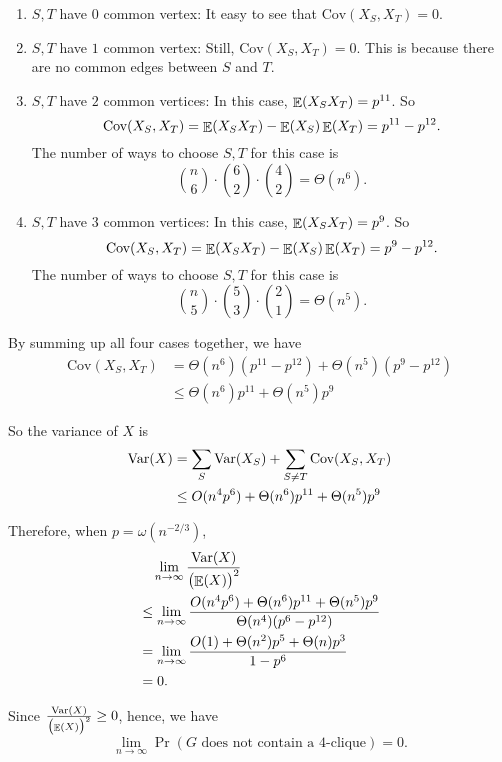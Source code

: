 \documentclass{homework}
\begin{document}
\begin{solution}
  \begin{enumerate}
    \item $S, T$ have $0$ common vertex: It easy to see that $\text{Cov}(X_S, X_T) = 0$.
    \item $S, T$ have $1$ common vertex: Still, $\text{Cov}(X_S, X_T) = 0$.
          This is because there are no common edges between $S$ and $T$.
    \item $S, T$ have $2$ common vertices: In this case, $\mathop{\mathbb{E}}\displaylimits(X_SX_T) = p^{11}$.
          So
          \begin{equation*}
            \text{Cov}(X_S, X_T) = \mathop{\mathbb{E}}\displaylimits(X_SX_T) - \mathop{\mathbb{E}}\displaylimits(X_S)\mathop{\mathbb{E}}\displaylimits(X_T) = p^{11} - p^{12}.
          \end{equation*}
          The number of ways to choose $S, T$ for this case is
          \begin{equation*}
            \binom{n}{6} \cdot \binom{6}{2} \cdot \binom{4}{2} = \Theta(n^6).
          \end{equation*}
    \item $S, T$ have $3$ common vertices: In this case, $\mathop{\mathbb{E}}\displaylimits(X_SX_T) = p^{9}$.
          So
          \begin{equation*}
            \text{Cov}(X_S, X_T) = \mathop{\mathbb{E}}\displaylimits(X_SX_T) - \mathop{\mathbb{E}}\displaylimits(X_S)\mathop{\mathbb{E}}\displaylimits(X_T) = p^{9} - p^{12}.
          \end{equation*}
          The number of ways to choose $S, T$ for this case is
          \begin{equation*}
            \binom{n}{5} \cdot \binom{5}{3} \cdot \binom{2}{1} = \Theta(n^5).
          \end{equation*}
  \end{enumerate}

  By summing up all four cases together, we have
  \begin{align*}
    \text{Cov}(X_S, X_T) & = \Theta(n^6)(p^{11} - p^{12}) + \Theta(n^5)(p^{9} - p^{12}) \\
    & \le \Theta(n^6)p^{11} + \Theta(n^5)p^{9}
  \end{align*}

  So the variance of $X$ is
  \begin{align*}
    \mathop{\mathrm{Var}}\displaylimits(X) & = \sum_{S}\mathop{\mathrm{Var}}\displaylimits(X_S) + \sum_{S \neq T}\text{Cov}(X_S, X_T) \\
    & \le O(n^4p^6) + \Theta(n^6)p^{11} + \Theta(n^5)p^{9}
  \end{align*}

  Therefore, when $p = \omega(n^{-2/3})$,
  \begin{align*}
    & \quad \lim_{n \to \infty} \frac{\mathop{\mathrm{Var}}\displaylimits(X)}{{\bigl(\mathop{\mathbb{E}}\displaylimits(X)\bigr)}^{2}} \\
    & \le \lim_{n \to \infty}\frac{O(n^4p^6) + \Theta(n^6)p^{11} + \Theta(n^5)p^{9}}
    {\Theta(n^4)(p^6 - p^{12})} \\
    & = \lim_{n \to \infty}\frac{O(1) + \Theta(n^2)p^5 + \Theta(n)p^3}{1 - p^6} \\
    & = 0.
  \end{align*}

  Since $\frac{\mathop{\mathrm{Var}}\displaylimits(X)}{{\bigl(\mathop{\mathbb{E}}\displaylimits(X)\bigr)}^{2}} \ge 0$, hence, we have
  \begin{equation*}
    \lim_{n \to \infty} \Pr(G \text{ does not contain a $4$-clique}) = 0.
  \end{equation*}

\end{solution}
\end{document}

